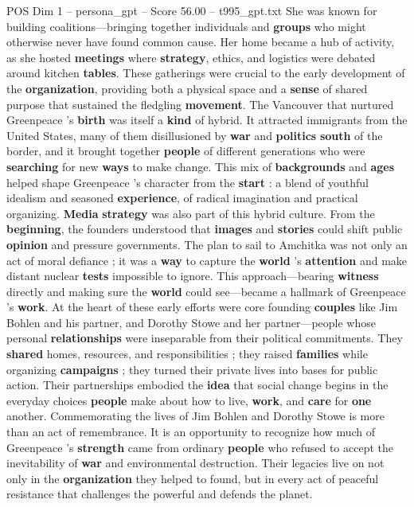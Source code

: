 \begin{textsample}{POS Dim 1 – persona\_gpt – Score 56.00 – t995\_gpt.txt}
She was known for building coalitions—bringing together individuals and \textbf{groups} who might otherwise never have found common cause.
Her home became a hub of activity, as she hosted \textbf{meetings} where \textbf{strategy}, ethics, and logistics were debated around kitchen \textbf{tables}.
These gatherings were crucial to the early development of the \textbf{organization}, providing both a physical space and a \textbf{sense} of shared purpose that sustained the fledgling \textbf{movement}.
The Vancouver that nurtured Greenpeace ’s \textbf{birth} was itself a \textbf{kind} of hybrid.
It attracted immigrants from the United States, many of them disillusioned by \textbf{war} and \textbf{politics} \textbf{south} of the border, and it brought together \textbf{people} of different generations who were \textbf{searching} for new \textbf{ways} to make change.
This mix of \textbf{backgrounds} and \textbf{ages} helped shape Greenpeace ’s character from the \textbf{start} : a blend of youthful idealism and seasoned \textbf{experience}, of radical imagination and practical organizing. \textbf{Media} \textbf{strategy} was also part of this hybrid culture.
From the \textbf{beginning}, the founders understood that \textbf{images} and \textbf{stories} could shift public \textbf{opinion} and pressure governments.
The plan to sail to Amchitka was not only an act of moral defiance ; it was a \textbf{way} to capture the \textbf{world} ’s \textbf{attention} and make distant nuclear \textbf{tests} impossible to ignore.
This approach—bearing \textbf{witness} directly and making sure the \textbf{world} could see—became a hallmark of Greenpeace ’s \textbf{work}.
At the heart of these early efforts were core founding \textbf{couples} like Jim Bohlen and his partner, and Dorothy Stowe and her partner—people whose personal \textbf{relationships} were inseparable from their political commitments.
They \textbf{shared} homes, resources, and responsibilities ; they raised \textbf{families} while organizing \textbf{campaigns} ; they turned their private lives into bases for public action.
Their partnerships embodied the \textbf{idea} that social change begins in the everyday choices \textbf{people} make about how to live, \textbf{work}, and \textbf{care} for \textbf{one} another.
Commemorating the lives of Jim Bohlen and Dorothy Stowe is more than an act of remembrance.
It is an opportunity to recognize how much of Greenpeace ’s \textbf{strength} came from ordinary \textbf{people} who refused to accept the inevitability of \textbf{war} and environmental destruction.
Their legacies live on not only in the \textbf{organization} they helped to found, but in every act of peaceful resistance that challenges the powerful and defends the planet.

\end{textsample}
